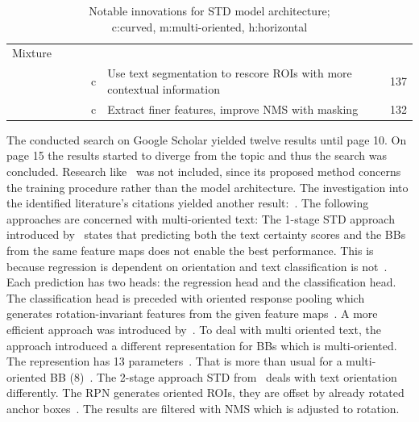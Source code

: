 \begin{table}[h]
\begin{tabular}{p{}p{}p{}p{}
            p{}p{}}
        \midrule
        Mixture & & \\
            & &~\cite{xie_scene_2018} & c & Use text segmentation to rescore \acp{ROI} with more
                contextual information & 137 \\
            & &~\cite{dai_fused_2018} & c & Extract finer features, improve \ac{NMS} with masking
                & 132 \\
        \bottomrule
    \end{tabular}
    \captionsetup{justification=centering}
    \caption[Notable innovations for STD model architecture]{%
        Notable innovations for STD model architecture; \\
        c:curved, m:multi-oriented, h:horizontal\label{tb:STD-steps-properties}
    }
\end{table}
The conducted search on Google Scholar yielded twelve results until page 10.
On page 15 the results started to diverge from the topic and thus the search was concluded.
Research like~\cite{xue_accurate_2018} was not included, since its proposed method concerns the
training procedure rather than the model architecture.
The investigation into the identified literature's citations yielded another
result:~\cite{ferrari_textsnake_2018}.
The following approaches are concerned with multi-oriented text:
The 1-stage \ac{STD} approach introduced by~\cite{liao_rotation-sensitive_2018} states that
predicting both the text certainty scores and the \acp{BB} from the same feature maps does not
enable the best performance.
This is because regression is dependent on orientation and text classification is
not~\citep{liao_rotation-sensitive_2018}.
Each prediction has two heads: the regression head and the classification head.
The classification head is preceded with oriented response pooling which generates rotation-invariant
features from the given feature maps~\citep{liao_rotation-sensitive_2018}.
A more efficient approach was introduced by~\citep{liao_textboxes_2018}.
To deal with multi oriented text, the approach introduced a different representation for \acp{BB}
which is multi-oriented.
The represention has 13 parameters~\citep{liao_textboxes_2018}.
That is more than usual for a multi-oriented \ac{BB} (8)~\citep{ma_arbitrary-oriented_2018}.
The 2-stage approach \ac{STD} from~\cite{ma_arbitrary-oriented_2018} deals with text orientation
differently.
The \ac{RPN} generates oriented \acp{ROI}, they are offset by already rotated anchor
boxes~\citep{ma_arbitrary-oriented_2018}.
The results are filtered with \ac{NMS} which is adjusted to rotation.

